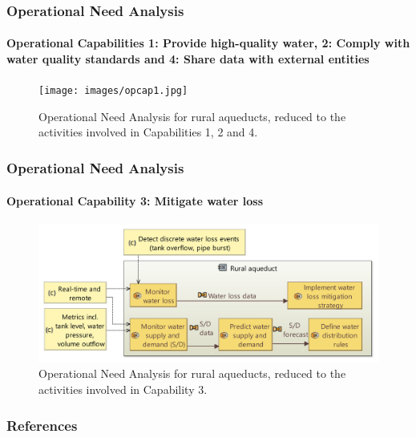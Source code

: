 \documentclass{beamer}
\begin{document}
\begin{frame}
    \frametitle{Operational Need Analysis}
    \framesubtitle{Operational Capabilities 1: Provide high-quality water, 2: Comply with water quality standards and 4: Share data with external entities}

    \begin{figure}
        \centering
        \texttt{[image: images/opcap1.jpg]}
        \caption{Operational Need Analysis for rural aqueducts, reduced to the activities involved in Capabilities 1, 2 and 4.}
    \end{figure}
\end{frame}

\begin{frame}
    \frametitle{Operational Need Analysis}
    \framesubtitle{Operational Capability 3: Mitigate water loss}

    \begin{figure}
        \centering
        \includegraphics[width=\textwidth]{images/opcap3.jpg}
        \caption{Operational Need Analysis for rural aqueducts, reduced to the activities involved in Capability 3.}
    \end{figure}
\end{frame}

%

\begin{frame}
    \frametitle{References}
    
    
\end{frame}
\end{document}
